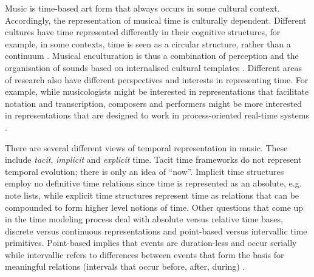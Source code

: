Music is time-based art form that always occurs in some cultural
context. Accordingly, the representation of musical time is 
culturally dependent. Different cultures have time represented 
differently in their cognitive structures, for example, in some 
contexts, time is seen as a circular structure, rather than a
continuum \cite{Gardenfors:2000}. Musical enculturation is thus a 
combination of perception and the organisation of sounds based on 
internalised cultural templates \cite[p. 5]{Smith:99}. Different areas
of research also have different perspectives and interests in
representing time. For example, while musicologists might be
interested in representations that facilitate notation and transcription,
composers and performers might be more interested in representations that 
are designed to work in process-oriented real-time systems \cite{Honing:93}.

There are several different views of temporal representation in
music. These include {\it tacit}, {\it implicit} and {\it explicit}
time. Tacit time frameworks do not represent temporal evolution; there is 
only an idea of ``now''. Implicit time structures employ no definitive 
time relations since time is represented as an absolute, e.g. note
lists, while explicit time structures represent time as relations that
can be compounded to form higher level notions of time. Other
questions that come up in the time modeling process deal with absolute
versus relative time bases, discrete versus continuous representations
and point-based versus intervallic time primitives. Point-based
implies that events are duration-less and occur serially while
intervallic refers to differences between events that form the basis
for meaningful relations (intervals that occur before, after, during) \cite{Honing:93}.

